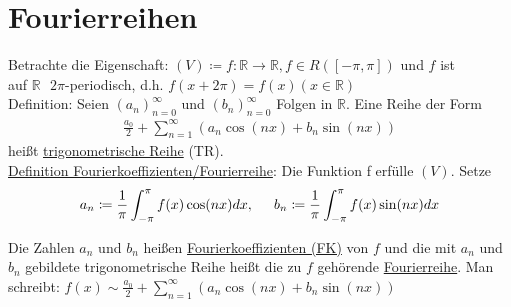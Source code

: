 \documentclass{article}
\begin{document}
\section{Fourierreihen}
Betrachte die Eigenschaft: $(V) \coloneqq f: \mathbb{R} \to \mathbb{R}, f \in R([-\pi,\pi])$ und $f$ ist \\
auf $\mathbb{R} \text{ }2\pi$-periodisch, d.h. $f(x+2\pi) = f(x) (x \in \mathbb{R})$ \\

Definition: Seien $(a_n)_{n=0}^{\infty}$ und $(b_n)_{n=0}^{\infty}$ Folgen in $\mathbb{R}$. Eine Reihe der Form
\begin{align*}
    \frac{a_0}{2} + \sum \limits_{n=1}^{\infty} (a_n \cos (nx) + b_n \sin (nx))
\end{align*}
heißt \underline{trigonometrische Reihe} (TR). \\

\underline{Definition Fourierkoeffizienten/Fourierreihe}:
Die Funktion f erfülle $(V)$. Setze 
\begin{align*}
    a_n \coloneqq \frac{1}{\pi} \int_{-\pi}^{\pi} f(x) \cos(nx) dx, \hspace{0.5cm}b_n \coloneqq \frac{1}{\pi} \int_{-\pi}^{\pi} f(x) \sin(nx) dx
\end{align*}

Die Zahlen $a_n$ und $b_n$ heißen \underline{Fourierkoeffizienten (FK)} von $f$ und die mit $a_n$ und $b_n$ gebildete trigonometrische Reihe heißt die zu $f$
gehörende \underline{Fourierreihe}. Man schreibt: $f(x) \sim \frac{a_0}{2} + \sum \limits_{n=1}^{\infty} (a_n \cos(nx) + b_n \sin(nx))$
\end{document}
